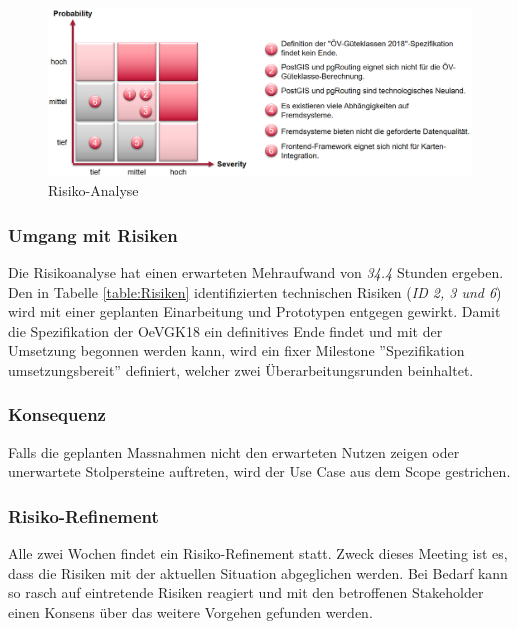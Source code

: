 \begin{figure}[ht]
    \centering
    \includegraphics[width=1.0\linewidth]{projectdoc/img/risk_analysis}
    \caption[Risiko-Analyse]{Risiko-Analyse}
    \label{fig:risk_analysis}
\end{figure}

\subsubsection{Umgang mit Risiken}
\label{Risiken:Umang mit Risiken}

Die Risikoanalyse hat einen erwarteten Mehraufwand von \emph{34.4} Stunden ergeben.
Den in Tabelle \ref{table:Risiken} identifizierten technischen Risiken (\emph{ID 2, 3 und 6}) wird mit einer geplanten Einarbeitung und Prototypen entgegen gewirkt.
Damit die Spezifikation der \gls{OeVGK18} ein definitives Ende findet und mit der Umsetzung begonnen werden kann, wird ein fixer Milestone ''Spezifikation umsetzungsbereit'' definiert, welcher zwei Überarbeitungsrunden beinhaltet.

\subsubsection{Konsequenz}
\label{Risiken:Konsequenz}

Falls die geplanten Massnahmen nicht den erwarteten Nutzen zeigen oder unerwartete Stolpersteine auftreten, wird der Use Case  aus dem Scope gestrichen.

\subsubsection{Risiko-Refinement}
\label{Risiken:Risiko-Refinement}

Alle zwei Wochen findet ein Risiko-Refinement statt.
Zweck dieses Meeting ist es, dass die Risiken mit der aktuellen Situation abgeglichen werden.
Bei Bedarf kann so rasch auf eintretende Risiken reagiert und mit den betroffenen Stakeholder einen Konsens über das weitere Vorgehen gefunden werden.
